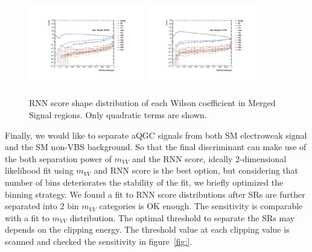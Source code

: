 \begin{figure}[]
    \centering
   \includegraphics[width=0.45\textwidth]{figures/aQGC/RNNScoreMerged_SR_HP_aQGC.pdf}
   \includegraphics[width=0.45\textwidth]{figures/aQGC/RNNScoreMerged_SR_LP_aQGC.pdf}
    \caption{RNN score shape distribution of each Wilson coefficient in Merged Signal regions. Only quadratic terms are shown.}
    \label{fig:2lepaQGCshapeRNNh}
\end{figure}
Finally, we would like to separate aQGC signals from both SM electroweak signal and the SM non-VBS background.
So that the final discriminant can make use of the both separation power of $m_{VV}$ and the RNN score, ideally 2-dimensional likelihood fit using $m_{VV}$ and RNN score is the best option, but considering that number of bins deteriorates the stability of the fit, we briefly optimized the binning strategy.
We found a fit to RNN score distributions after SRs are further separated into 2 bin $m_{VV}$ categories is OK enough.
The sensitivity is comparable with a fit to $m_{VV}$ distribution.
The optimal threshold to separate the SRs may depends on the clipping energy.
The threshold value at each clipping value is scanned and checked the sensitivity in figure~\ref{fig:}.
